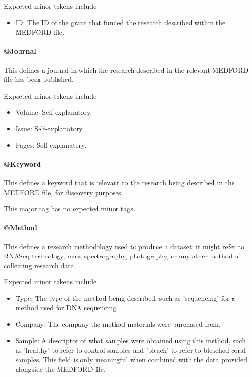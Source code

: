 \documentclass[10pt]{article}
\begin{document}
    Expected minor tokens include:
    \begin{itemize}
        \item ID: The ID of the grant that funded the research described within the MEDFORD file.
    \end{itemize}
    
    \paragraph{@Journal}
    
    This defines a journal in which the research described in the relevant MEDFORD file has been published.
    
    Expected minor tokens include:
    \begin{itemize}
        \item Volume: Self-explanatory.
        \item Issue: Self-explanatory.
        \item Pages: Self-explanatory.
    \end{itemize}
    
    \paragraph{@Keyword}
    
    This defines a keyword that is relevant to the research being described in the MEDFORD file, for discovery purposes.
    
    This major tag has no expected minor tags.
    
    \paragraph{@Method}
    
    This defines a research methodology used to produce a dataset; it might refer to RNASeq technology, mass spectrography, photography, or any other method of collecting research data.
    
    Expected minor tokens include:
    \begin{itemize}
        \item Type: The type of the method being described, such as 'sequencing' for a method used for DNA sequencing.
        \item Company: The company the method materials were purchased from.
        \item Sample: A descriptor of what samples were obtained using this method, such as 'healthy' to refer to control samples and 'bleach' to refer to bleached coral samples. This field is only meaningful when combined with the data provided alongside the MEDFORD file.
    \end{itemize}
    
\end{document}
